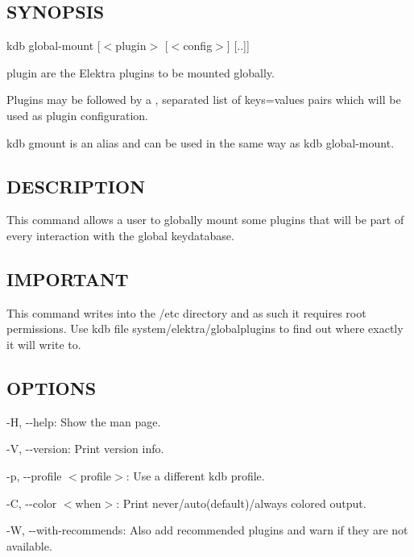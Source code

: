 \subsection*{S\+Y\+N\+O\+P\+S\+IS}

{\ttfamily kdb global-\/mount \mbox{[}$<$plugin$>$ \mbox{[}$<$config$>$\mbox{]} \mbox{[}..\mbox{]}\mbox{]}}


\begin{DoxyItemize}
\item {\ttfamily plugin} are the Elektra plugins to be mounted globally.
\item Plugins may be followed by a {\ttfamily ,} separated list of {\ttfamily keys=values} pairs which will be used as plugin configuration.
\end{DoxyItemize}

{\ttfamily kdb gmount} is an alias and can be used in the same way as {\ttfamily kdb global-\/mount}.

\subsection*{D\+E\+S\+C\+R\+I\+P\+T\+I\+ON}

This command allows a user to globally mount some plugins that will be part of every interaction with the global keydatabase.

\subsection*{I\+M\+P\+O\+R\+T\+A\+NT}

This command writes into the {\ttfamily /etc} directory and as such it requires root permissions. Use {\ttfamily kdb file system/elektra/globalplugins} to find out where exactly it will write to.

\subsection*{O\+P\+T\+I\+O\+NS}


\begin{DoxyItemize}
\item {\ttfamily -\/H}, {\ttfamily -\/-\/help}\+: Show the man page.
\item {\ttfamily -\/V}, {\ttfamily -\/-\/version}\+: Print version info.
\item {\ttfamily -\/p}, {\ttfamily -\/-\/profile $<$profile$>$}\+: Use a different kdb profile.
\item {\ttfamily -\/C}, {\ttfamily -\/-\/color $<$when$>$}\+: Print never/auto(default)/always colored output.
\item {\ttfamily -\/W}, {\ttfamily -\/-\/with-\/recommends}\+: Also add recommended plugins and warn if they are not available.
\end{DoxyItemize}

